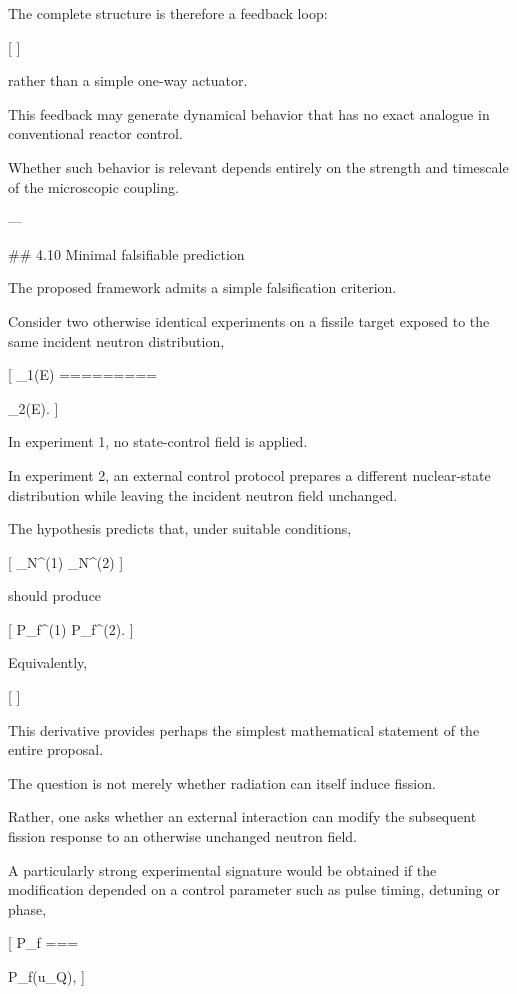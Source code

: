 The complete structure is therefore a feedback loop:

[
]

rather than a simple one-way actuator.

This feedback may generate dynamical behavior that has no exact analogue in conventional reactor control.

Whether such behavior is relevant depends entirely on the strength and timescale of the microscopic coupling.

---

## 4.10 Minimal falsifiable prediction

The proposed framework admits a simple falsification criterion.

Consider two otherwise identical experiments on a fissile target exposed to the same incident neutron distribution,

[
\Phi_1(E)
=========

\Phi_2(E).
]

In experiment 1, no state-control field is applied.

In experiment 2, an external control protocol prepares a different nuclear-state distribution while leaving the incident neutron field unchanged.

The hypothesis predicts that, under suitable conditions,

[
\rho_N^{(1)}
\neq
\rho_N^{(2)}
]

should produce

[
P_f^{(1)}
\neq
P_f^{(2)}.
]

Equivalently,

[
]

This derivative provides perhaps the simplest mathematical statement of the entire proposal.

The question is not merely whether radiation can itself induce fission.

Rather, one asks whether an external interaction can modify the subsequent fission response to an otherwise unchanged neutron field.

A particularly strong experimental signature would be obtained if the modification depended on a control parameter such as pulse timing, detuning or phase,

[
P_f
===

P_f(u_Q),
]

